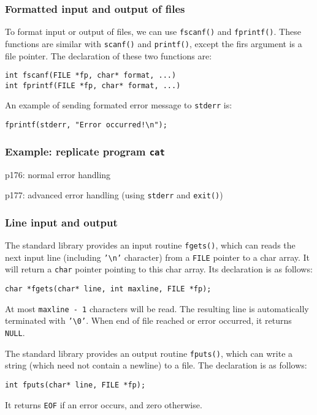 \documentclass[12pt]{article}
\begin{document}
\subsubsection{Formatted input and output of files}
\label{sec:org269f92e}
To format input or output of files, we can use \texttt{fscanf()} and \texttt{fprintf()}. These functions are similar with \texttt{scanf()} and \texttt{printf()}, except the firs argument is a file pointer. The declaration of these two functions are:
\begin{verbatim}
int fscanf(FILE *fp, char* format, ...)
int fprintf(FILE *fp, char* format, ...)
\end{verbatim}

An example of sending formated error message to \texttt{stderr} is:
\begin{verbatim}
fprintf(stderr, "Error occurred!\n");
\end{verbatim}
\subsubsection{Example: replicate program \texttt{cat}}
\label{sec:org7bafac4}
p176: normal error handling

p177: advanced error handling (using \texttt{stderr} and \texttt{exit()})
\subsubsection{Line input and output}
\label{sec:org133c5cf}
The standard library provides an input routine \texttt{fgets()}, which can reads the next input line (including \texttt{'\textbackslash{}n'} character) from a \texttt{FILE} pointer to a char array. It will return a \texttt{char} pointer pointing to this char array. Its declaration is as follows:
\begin{verbatim}
char *fgets(char* line, int maxline, FILE *fp);
\end{verbatim}
At most \texttt{maxline - 1} characters will be read. The resulting line is automatically terminated with \texttt{'\textbackslash{}0'}. When end of file reached or error occurred, it returns \texttt{NULL}.

The standard library provides an output routine \texttt{fputs()}, which can write a string (which need not contain a newline) to a file. The declaration is as follows:
\begin{verbatim}
int fputs(char* line, FILE *fp);
\end{verbatim}
It returns \texttt{EOF} if an error occurs, and zero otherwise.
\end{document}
